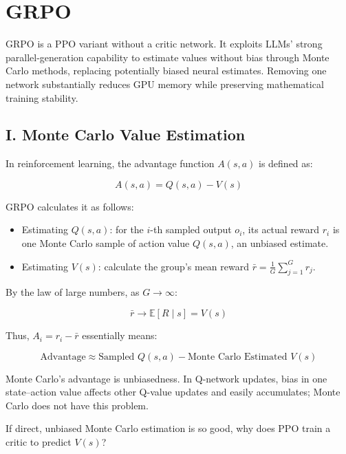 \setcounter{section}{6}

\hypertarget{grpo}{%
\section{GRPO}\label{grpo}}

GRPO is a PPO variant without a critic network. It exploits LLMs' strong parallel-generation capability to estimate values without bias through Monte Carlo methods, replacing potentially biased neural estimates. Removing one network substantially reduces GPU memory while preserving mathematical training stability.

\hypertarget{i.-monte-carlo-value-estimation}{%
\subsection{I. Monte Carlo Value Estimation}\label{i.-monte-carlo-value-estimation}}

In reinforcement learning, the advantage function \(A(s,a)\) is defined as:

\[
A(s,a)=Q(s,a)-V(s)
\]

GRPO calculates it as follows:

\begin{itemize}
\tightlist
\item
  Estimating \(Q(s,a)\): for the \(i\)-th sampled output \(o_i\), its actual reward \(r_i\) is one Monte Carlo sample of action value \(Q(s,a)\), an unbiased estimate.
\item
  Estimating \(V(s)\): calculate the group's mean reward \(\bar{r}=\frac{1}{G}\sum_{j=1}^{G}r_j\).
\end{itemize}

By the law of large numbers, as \(G\to\infty\):

\[
\bar{r}\to \mathbb{E}[R\mid s]=V(s)
\]

Thus, \(A_i=r_i-\bar{r}\) essentially means:

\[
\text{Advantage}\approx \text{Sampled }Q(s,a)-\text{Monte Carlo Estimated }V(s)
\]

Monte Carlo's advantage is unbiasedness. In Q-network updates, bias in one state--action value affects other Q-value updates and easily accumulates; Monte Carlo does not have this problem.

If direct, unbiased Monte Carlo estimation is so good, why does PPO train a critic to predict \(V(s)\)?

